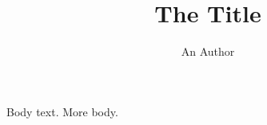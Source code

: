 \documentclass{zzfma}
\title{The Title}\author{An Author}
\begin{document}
\maketitle
Body text.
\newpage
More body.
\end{document}
